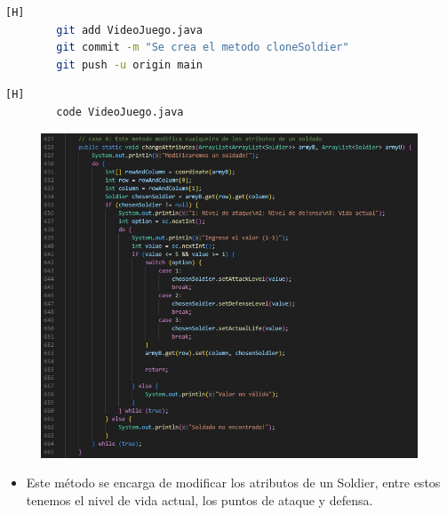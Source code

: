 \documentclass{article}
\begin{document}
	
	\begin{lstlisting}[language=bash,caption={Commit: c98829adbf11f4704c7b2950873e39e70603d38d}][H]
		git add VideoJuego.java
		git commit -m "Se crea el metodo cloneSoldier"			
		git push -u origin main
	\end{lstlisting}
	
	
	
	
	\begin{lstlisting}[language=bash,caption={Se implementa el método para cambiar los atributos de un soldado }][H]
		code VideoJuego.java
	\end{lstlisting}
	
	\begin{figure}[H]
		\centering
		\includegraphics[width=1\textwidth,keepaspectratio]{img/changeAttribute.jpg}
	\end{figure}
	
	\begin{itemize}	
		\item Este método se encarga de modificar los atributos de un Soldier, entre estos tenemos el nivel de vida actual, los puntos de ataque y defensa.
	\end{itemize}
	
\end{document}
